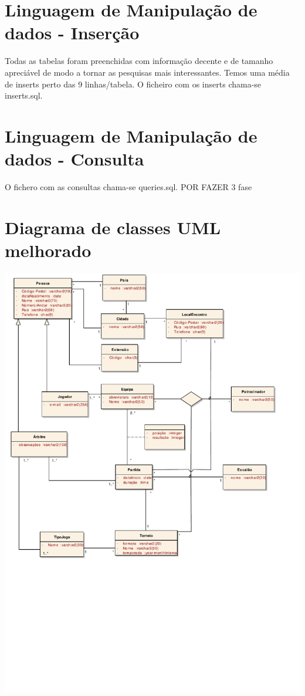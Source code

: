 \documentclass[a4paper]{article}
\begin{document}
\section{Linguagem de Manipulação de dados - Inserção}
Todas as tabelas foram preenchidas com informação decente e de tamanho apreciável de modo a tornar as pesquisas mais interessantes. Temos uma média de inserts perto das 9 linhas/tabela. O ficheiro com os inserts chama-se inserts.sql.

\section{Linguagem de Manipulação de dados - Consulta}
O fichero com as consultas chama-se queries.sql.
POR FAZER 3 fase


\section{Diagrama de classes UML melhorado}
\includegraphics[scale=0.80]{./classModel.pdf}
\end{document}
